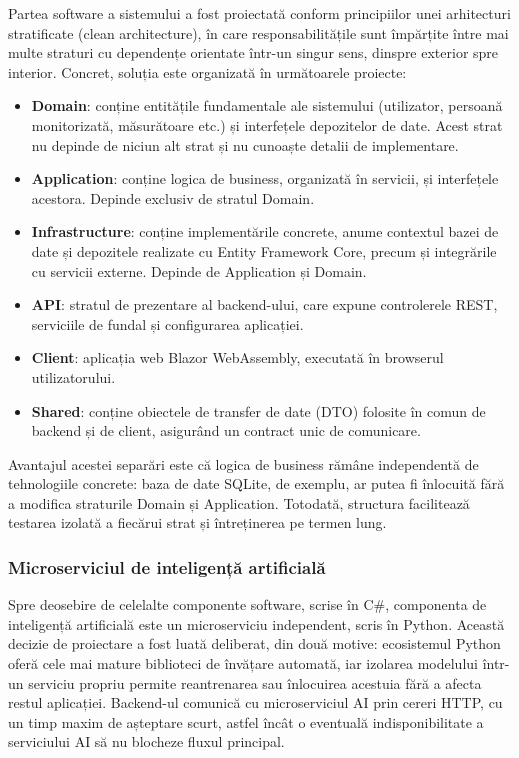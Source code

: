 ﻿\documentclass[12pt,a4paper,twoside]{article}
\begin{document}
Partea software a sistemului a fost proiectată conform principiilor unei arhitecturi stratificate (clean architecture), în care responsabilitățile sunt împărțite între mai multe straturi cu dependențe orientate într-un singur sens, dinspre exterior spre interior. Concret, soluția este organizată în următoarele proiecte:

\begin{itemize}[leftmargin=1.5em]
\item \textbf{Domain}: conține entitățile fundamentale ale sistemului (utilizator, persoană monitorizată, măsurătoare etc.) și interfețele depozitelor de date. Acest strat nu depinde de niciun alt strat și nu cunoaște detalii de implementare.
\item \textbf{Application}: conține logica de business, organizată în servicii, și interfețele acestora. Depinde exclusiv de stratul Domain.
\item \textbf{Infrastructure}: conține implementările concrete, anume contextul bazei de date și depozitele realizate cu Entity Framework Core, precum și integrările cu servicii externe. Depinde de Application și Domain.
\item \textbf{API}: stratul de prezentare al backend-ului, care expune controlerele REST, serviciile de fundal și configurarea aplicației.
\item \textbf{Client}: aplicația web Blazor WebAssembly, executată în browserul utilizatorului.
\item \textbf{Shared}: conține obiectele de transfer de date (DTO) folosite în comun de backend și de client, asigurând un contract unic de comunicare.
\end{itemize}

Avantajul acestei separări este că logica de business rămâne independentă de tehnologiile concrete: baza de date SQLite, de exemplu, ar putea fi înlocuită fără a modifica straturile Domain și Application. Totodată, structura facilitează testarea izolată a fiecărui strat și întreținerea pe termen lung.

\subsubsection{Microserviciul de inteligență artificială}

Spre deosebire de celelalte componente software, scrise în C\#, componenta de inteligență artificială este un microserviciu independent, scris în Python. Această decizie de proiectare a fost luată deliberat, din două motive: ecosistemul Python oferă cele mai mature biblioteci de învățare automată, iar izolarea modelului într-un serviciu propriu permite reantrenarea sau înlocuirea acestuia fără a afecta restul aplicației. Backend-ul comunică cu microserviciul AI prin cereri HTTP, cu un timp maxim de așteptare scurt, astfel încât o eventuală indisponibilitate a serviciului AI să nu blocheze fluxul principal.
\end{document}
